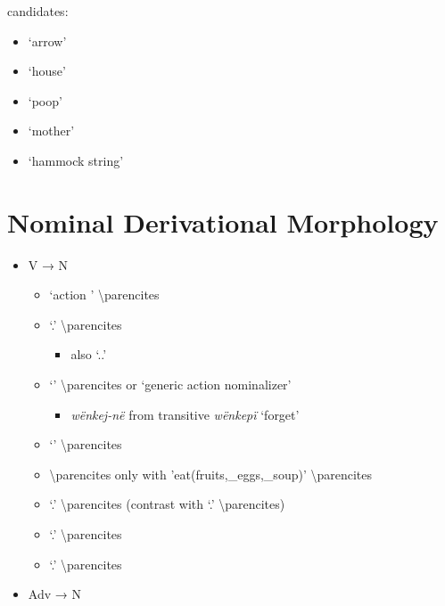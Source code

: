\documentclass{memoir}
\begin{document}
candidates:

\begin{itemize}
\tightlist
\item
  `arrow'
\item
  `house'
\item
  `poop'
\item
  `mother'
\item
  `hammock string'
\end{itemize}

\section{\texorpdfstring{Nominal Derivational Morphology
\label{sec:nounderiv}}{Nominal Derivational Morphology }}

\begin{itemize}
\tightlist
\item
  V → N

  \begin{itemize}
  \tightlist
  \item
     `action ' \textbackslash parencites
  \item
     `.' \textbackslash parencites

    \begin{itemize}
    \tightlist
    \item
      also `..'
    \end{itemize}
  \item
     `' \textbackslash parencites or `generic action
    nominalizer'

    \begin{itemize}
    \tightlist
    \item
      \emph{wënkej-në} from transitive \emph{wënkepï} `forget'
    \end{itemize}
  \item
     `' \textbackslash parencites
  \item
     \parencitesV{} \textbackslash parencites only with
     'eat(fruits,\_eggs,\_soup)' \textbackslash parencites
  \item
     `.' \textbackslash parencites (contrast
    with  `.' \textbackslash parencites)
  \item
     `.' \textbackslash parencites
  \item
     `.' \textbackslash parencites
  \end{itemize}
\item
  Adv → N


\end{itemize}
\end{document}
